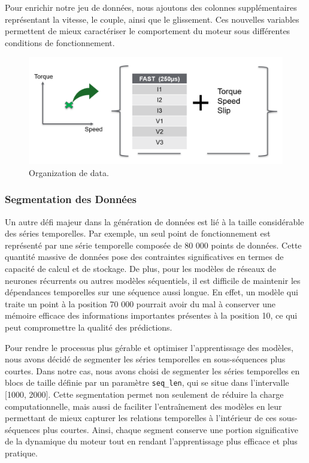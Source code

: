 Pour enrichir notre jeu de données, nous ajoutons des colonnes supplémentaires
représentant la vitesse, le couple, ainsi que le glissement. Ces nouvelles
variables permettent de mieux caractériser le comportement du moteur sous
différentes conditions de fonctionnement.

\begin{figure}[hbt!]
  \centering
  \includegraphics[width=13cm]{images_pfe/couple_vittese_glissement.png}
  \caption{Organization de data.}
  \label{fig:data_v_i}
\end{figure}
\FloatBarrier

\subsubsection{Segmentation des Données}
Un autre défi majeur dans la génération de données est lié à la taille
considérable des séries temporelles. Par exemple, un seul point de
fonctionnement est représenté par une série temporelle composée de 80 000
points de données. Cette quantité massive de données pose des contraintes
significatives en termes de capacité de calcul et de stockage. De plus, pour
les modèles de réseaux de neurones récurrents ou autres modèles séquentiels, il
est difficile de maintenir les dépendances temporelles sur une séquence aussi
longue. En effet, un modèle qui traite un point à la position 70 000 pourrait
avoir du mal à conserver une mémoire efficace des informations importantes
présentes à la position 10, ce qui peut compromettre la qualité des
prédictions.

Pour rendre le processus plus gérable et optimiser l'apprentissage des modèles,
nous avons décidé de segmenter les séries temporelles en sous-séquences plus
courtes. Dans notre cas, nous avons choisi de segmenter les séries temporelles
en blocs de taille définie par un paramètre \texttt{seq\_len}, qui se situe
dans l'intervalle [1000, 2000]. Cette segmentation permet non seulement de
réduire la charge computationnelle, mais aussi de faciliter l'entraînement des
modèles en leur permettant de mieux capturer les relations temporelles à
l'intérieur de ces sous-séquences plus courtes. Ainsi, chaque segment conserve
une portion significative de la dynamique du moteur tout en rendant
l'apprentissage plus efficace et plus pratique.

